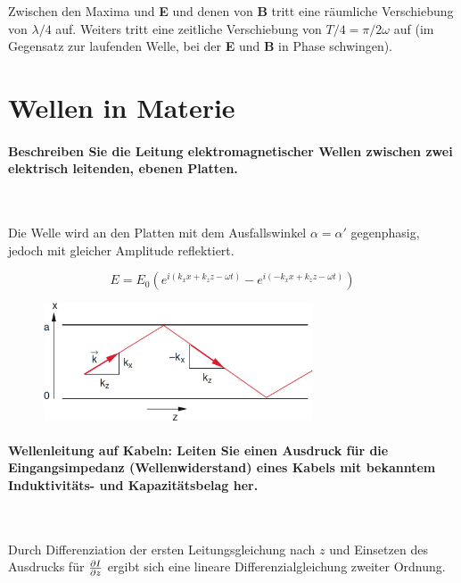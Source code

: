 \documentclass[a4paper, 11pt, ngerman, parskip=half]{scrartcl}
\begin{document}
Zwischen den Maxima und \textbf{E} und denen von \textbf{B} tritt eine räumliche Verschiebung von
$\lambda/4$ auf. Weiters tritt eine zeitliche Verschiebung von $T/4 = \pi / 2 \omega$ auf (im
Gegensatz zur laufenden Welle, bei der \textbf{E} und \textbf{B} in Phase schwingen).

\newpage

\section{Wellen in Materie}

\paragraph{Beschreiben Sie die Leitung elektromagnetischer Wellen zwischen zwei elektrisch
leitenden, ebenen Platten.} ~

Die Welle wird an den Platten mit dem Ausfallswinkel $\alpha = \alpha'$ gegenphasig, jedoch mit
gleicher Amplitude reflektiert.

\begin{equation}
    E = E_0(e^{i(k_x x + k_z z - \omega t)} - e^{i(-k_x x + k_z z - \omega t)})
\end{equation}

\begin{figure}[H]
    \centering
    \includegraphics[width=8cm]{image/14/1}
\end{figure}

\paragraph{Wellenleitung auf Kabeln: Leiten Sie einen Ausdruck für die Eingangsimpedanz
(Wellenwiderstand) eines Kabels mit bekanntem Induktivitäts- und Kapazitätsbelag her.} ~

Durch Differenziation der ersten Leitungsgleichung nach $z$ und Einsetzen des Ausdrucks für
$\pdv{I}{z}$ ergibt sich eine lineare Differenzialgleichung zweiter Ordnung.
\end{document}
